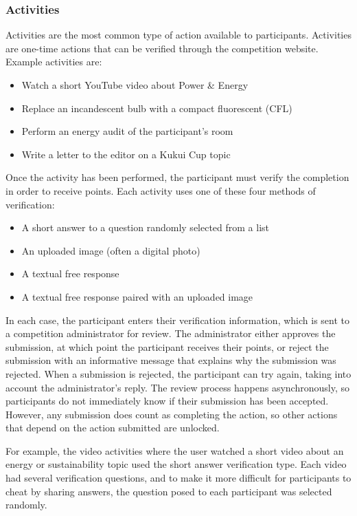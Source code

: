 \subsubsection{Activities}
\label{sec:activities}

Activities are the most common type of action available to participants. Activities are one-time actions that can be verified through the competition website. Example activities are:

\begin{itemize}
	\item Watch a short YouTube video about Power \& Energy
	\item Replace an incandescent bulb with a compact fluorescent (CFL)
	\item Perform an energy audit of the participant's room
	\item Write a letter to the editor on a Kukui Cup topic
\end{itemize}

Once the activity has been performed, the participant must verify the completion in order to receive points. Each activity uses one of these four methods of verification:

\begin{itemize}
	\item A short answer to a question randomly selected from a list
	\item An uploaded image (often a digital photo)
	\item A textual free response
	\item A textual free response paired with an uploaded image
\end{itemize}

In each case, the participant enters their verification information, which is sent to a competition administrator for review. The administrator either approves the submission, at which point the participant receives their points, or reject the submission with an informative message that explains why the submission was rejected. When a submission is rejected, the participant can try again, taking into account the administrator's reply. The review process happens asynchronously, so participants do not immediately know if their submission has been accepted. However, any submission does count as completing the action, so other actions that depend on the action submitted are unlocked.

For example, the video activities where the user watched a short video about an energy or sustainability topic used the short answer verification type. Each video had several verification questions, and to make it more difficult for participants to cheat by sharing answers, the question posed to each participant was selected randomly.

